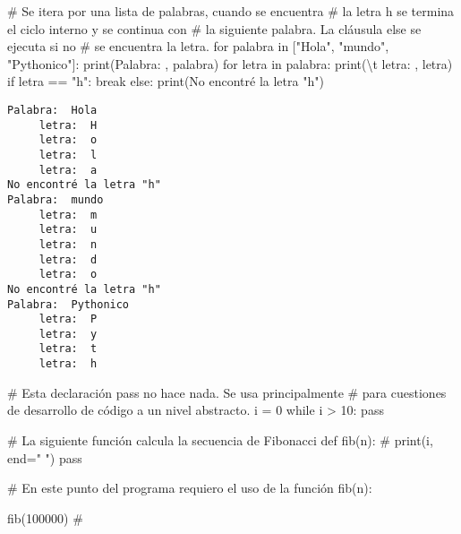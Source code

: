 \documentclass[
  letterpaper,
  DIV=11,
  numbers=noendperiod]{scrreprt}
\newenvironment{Shaded}{\begin{snugshade}}{\end{snugshade}}
\newcommand{\BuiltInTok}[1]{\textcolor[rgb]{0.00,0.23,0.31}{#1}}
\newcommand{\CharTok}[1]{\textcolor[rgb]{0.13,0.47,0.30}{#1}}
\newcommand{\CommentTok}[1]{\textcolor[rgb]{0.37,0.37,0.37}{#1}}
\newcommand{\ControlFlowTok}[1]{\textcolor[rgb]{0.00,0.23,0.31}{#1}}
\newcommand{\DecValTok}[1]{\textcolor[rgb]{0.68,0.00,0.00}{#1}}
\newcommand{\KeywordTok}[1]{\textcolor[rgb]{0.00,0.23,0.31}{#1}}
\newcommand{\NormalTok}[1]{\textcolor[rgb]{0.00,0.23,0.31}{#1}}
\newcommand{\OperatorTok}[1]{\textcolor[rgb]{0.37,0.37,0.37}{#1}}
\newcommand{\StringTok}[1]{\textcolor[rgb]{0.13,0.47,0.30}{#1}}
\begin{document}
\begin{Shaded}
\begin{Highlighting}[]
\CommentTok{\# Se itera por una lista de palabras, cuando se encuentra}
\CommentTok{\# la letra \textquotesingle{}h\textquotesingle{} se termina el ciclo interno y se continua con}
\CommentTok{\# la siguiente palabra. La cláusula \textquotesingle{}else\textquotesingle{} se ejecuta si no}
\CommentTok{\# se encuentra la letra.}
\ControlFlowTok{for}\NormalTok{ palabra }\KeywordTok{in}\NormalTok{ [}\StringTok{"Hola"}\NormalTok{, }\StringTok{"mundo"}\NormalTok{, }\StringTok{"Pythonico"}\NormalTok{]:}
    \BuiltInTok{print}\NormalTok{(}\StringTok{\textquotesingle{}Palabra: \textquotesingle{}}\NormalTok{, palabra)}
    \ControlFlowTok{for}\NormalTok{ letra }\KeywordTok{in}\NormalTok{ palabra:}
        \BuiltInTok{print}\NormalTok{(}\StringTok{\textquotesingle{}}\CharTok{\textbackslash{}t}\StringTok{ letra: \textquotesingle{}}\NormalTok{, letra)}
        \ControlFlowTok{if}\NormalTok{ letra }\OperatorTok{==} \StringTok{"h"}\NormalTok{:}
            \ControlFlowTok{break}
    \ControlFlowTok{else}\NormalTok{:}
        \BuiltInTok{print}\NormalTok{(}\StringTok{\textquotesingle{}No encontré la letra "h"\textquotesingle{}}\NormalTok{)}
\end{Highlighting}
\end{Shaded}

\begin{verbatim}
Palabra:  Hola
     letra:  H
     letra:  o
     letra:  l
     letra:  a
No encontré la letra "h"
Palabra:  mundo
     letra:  m
     letra:  u
     letra:  n
     letra:  d
     letra:  o
No encontré la letra "h"
Palabra:  Pythonico
     letra:  P
     letra:  y
     letra:  t
     letra:  h
\end{verbatim}

\begin{Shaded}
\begin{Highlighting}[]
\CommentTok{\# Esta declaración pass no hace nada. Se usa principalmente }
\CommentTok{\# para cuestiones de desarrollo de código a un nivel abstracto.}
\NormalTok{i }\OperatorTok{=} \DecValTok{0}
\ControlFlowTok{while}\NormalTok{ i }\OperatorTok{\textgreater{}} \DecValTok{10}\NormalTok{:}
    \ControlFlowTok{pass}
\end{Highlighting}
\end{Shaded}

\begin{Shaded}
\begin{Highlighting}[]
\CommentTok{\# La siguiente función calcula la secuencia de Fibonacci}
\KeywordTok{def}\NormalTok{ fib(n):}
\CommentTok{\#    print(i, end=" ")}
    \ControlFlowTok{pass}

\CommentTok{\# En este punto del programa requiero el uso de la función fib(n):}

\NormalTok{fib(}\DecValTok{100000}\NormalTok{) }\CommentTok{\# }
\end{Highlighting}
\end{Shaded}
\end{document}
